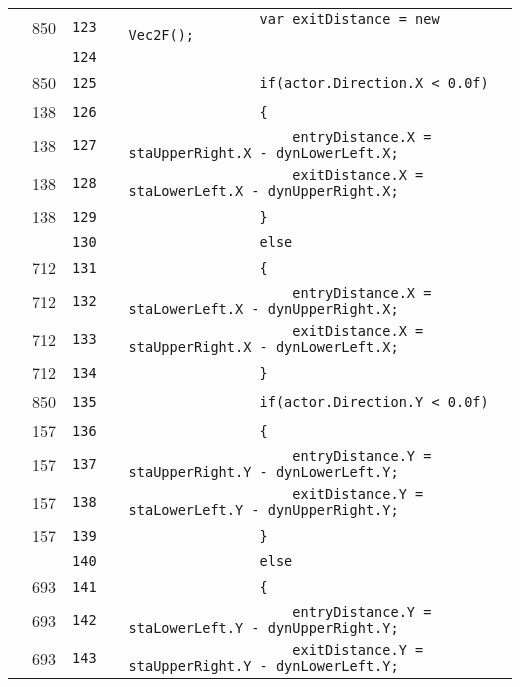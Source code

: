 \documentclass[a4paper,landscape,10pt]{article}
\begin{document}
\begin{longtable}[l]{lrrll}
\cellcolor{green} & 850 & \verb~123~ & & \verb~                var exitDistance = new Vec2F();~\\
\cellcolor{gray} &  & \verb~124~ & & \verb~~\\
\cellcolor{green} & 850 & \verb~125~ & & \verb~                if(actor.Direction.X < 0.0f)~\\
\cellcolor{green} & 138 & \verb~126~ & & \verb~                {~\\
\cellcolor{green} & 138 & \verb~127~ & & \verb~                    entryDistance.X = staUpperRight.X - dynLowerLeft.X;~\\
\cellcolor{green} & 138 & \verb~128~ & & \verb~                    exitDistance.X = staLowerLeft.X - dynUpperRight.X;~\\
\cellcolor{green} & 138 & \verb~129~ & & \verb~                }~\\
\cellcolor{gray} &  & \verb~130~ & & \verb~                else~\\
\cellcolor{green} & 712 & \verb~131~ & & \verb~                {~\\
\cellcolor{green} & 712 & \verb~132~ & & \verb~                    entryDistance.X = staLowerLeft.X - dynUpperRight.X;~\\
\cellcolor{green} & 712 & \verb~133~ & & \verb~                    exitDistance.X = staUpperRight.X - dynLowerLeft.X;~\\
\cellcolor{green} & 712 & \verb~134~ & & \verb~                }~\\
\cellcolor{green} & 850 & \verb~135~ & & \verb~                if(actor.Direction.Y < 0.0f)~\\
\cellcolor{green} & 157 & \verb~136~ & & \verb~                {~\\
\cellcolor{green} & 157 & \verb~137~ & & \verb~                    entryDistance.Y = staUpperRight.Y - dynLowerLeft.Y;~\\
\cellcolor{green} & 157 & \verb~138~ & & \verb~                    exitDistance.Y = staLowerLeft.Y - dynUpperRight.Y;~\\
\cellcolor{green} & 157 & \verb~139~ & & \verb~                }~\\
\cellcolor{gray} &  & \verb~140~ & & \verb~                else~\\
\cellcolor{green} & 693 & \verb~141~ & & \verb~                {~\\
\cellcolor{green} & 693 & \verb~142~ & & \verb~                    entryDistance.Y = staLowerLeft.Y - dynUpperRight.Y;~\\
\cellcolor{green} & 693 & \verb~143~ & & \verb~                    exitDistance.Y = staUpperRight.Y - dynLowerLeft.Y;~\\

\end{longtable}
\end{document}
